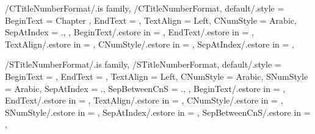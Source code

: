 
\pgfkeys
{
  /CTitleNumberFormat/.is family, /CTitleNumberFormat,
  default/.style =
  {
    BeginText = {Chapter },
    EndText = \empty,
    TextAlign = {Left}, %
    CNumStyle = Arabic,
    SepAtIndex = {.},
  },
  BeginText/.estore in = \GetCTitleNumberFormatBeginText,
  EndText/.estore in = \GetCTitleNumberFormatEndText,
  TextAlign/.estore in = \GetCTitleNumberFormatTextAlign,
  CNumStyle/.estore in = \GetCTitleNumberFormatCNumStyle,
  SepAtIndex/.estore in = \GetCTitleNumberFormatSepAtIndex,
} %

\newcommand\GetChapterTitleNumberFormatString{}
\newcommand\SetupChapterTitleNumberFormatString
{%
  \SetupTitleNumberFormatString{Chapter}%
  {%
    BeginText=\GetCTitleNumberFormatBeginText,%
    EndText=\GetCTitleNumberFormatEndText,%
    CNumStyle=\GetCTitleNumberFormatCNumStyle,%
    CCounterName=chapter,%
  }{\GetChapterTitleNumberFormatString}%
} %


\pgfkeys
{
  /STitleNumberFormat/.is family, /STitleNumberFormat,
  default/.style =
  {
    BeginText = \empty,
    EndText = \empty,
    TextAlign = {Left},
    CNumStyle = Arabic,
    SNumStyle = Arabic,
    SepAtIndex = {.}, %
    SepBetweenCnS = {.}, %
  },
  BeginText/.estore in = \GetSTitleNumberFormatBeginText,
  EndText/.estore in = \GetSTitleNumberFormatEndText,
  TextAlign/.estore in = \GetSTitleNumberFormatTextAlign,
  CNumStyle/.estore in = \GetSTitleNumberFormatCNumStyle,
  SNumStyle/.estore in = \GetSTitleNumberFormatSNumStyle,
  SepAtIndex/.estore in = \GetSTitleNumberFormatSepAtIndex,
  SepBetweenCnS/.estore in = \GetSTitleNumberFormatSepBetweenCnS,
} %

\newcommand\GetSectionTitleNumberFormatString{}
\newcommand\SetupSectionTitleNumberFormatString
{%
  \SetupTitleNumberFormatString{Section}%
  {%
    BeginText=\GetSTitleNumberFormatBeginText,%
    EndText=\GetSTitleNumberFormatEndText,%
    CNumStyle=\GetSTitleNumberFormatCNumStyle,%
    SNumStyle=\GetSTitleNumberFormatSNumStyle,%
    SepAtIndex=\GetSTitleNumberFormatSepAtIndex,%
    SepBetweenCnS=\GetSTitleNumberFormatSepBetweenCnS,%
    CCounterName=chapter,%
    SCounterName=section,%
  }{\GetSectionTitleNumberFormatString}%
} %


